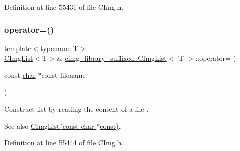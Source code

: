 Definition at line 55431 of file C\+Img.\+h.

\mbox{\label{structcimg__library__suffixed_1_1CImgList_a9db7c51d751bbc507f788dfd1eb63967}} 
\subsubsection{\texorpdfstring{operator=()}{operator=()}\hspace{0.1cm}{\footnotesize\ttfamily [3/4]}}
{\footnotesize\ttfamily template$<$typename T$>$ \\
\hyperlink{structcimg__library__suffixed_1_1CImgList}{C\+Img\+List}$<$T$>$\& \hyperlink{structcimg__library__suffixed_1_1CImgList}{cimg\+\_\+library\+\_\+suffixed\+::\+C\+Img\+List}$<$ T $>$\+::operator= (\begin{DoxyParamCaption}\item[{const \hyperlink{classchar}{char} $\ast$const}]{filename }\end{DoxyParamCaption})\hspace{0.3cm}{\ttfamily [inline]}}



Construct list by reading the content of a file . 

\begin{DoxySeeAlso}{See also}
\hyperlink{structcimg__library__suffixed_1_1CImgList_ac394d73bac5abc6aec337bc457695bdc}{C\+Img\+List(const char $\ast$const)}. 
\end{DoxySeeAlso}


Definition at line 55444 of file C\+Img.\+h.

\mbox{\label{structcimg__library__suffixed_1_1CImgList_ac8a59666c6750d3fc9eacc362c5c03a9}} 
